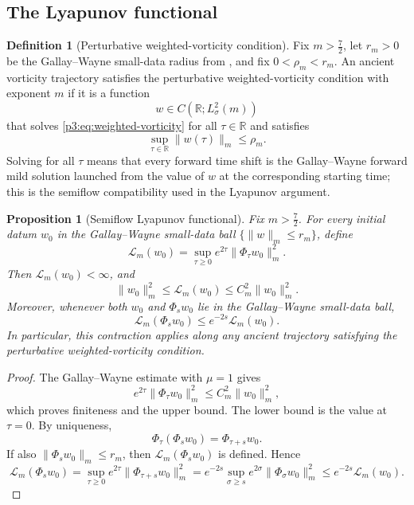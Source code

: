 \documentclass[11pt]{amsart}
\theoremstyle{plain}
\newtheorem{proposition}[proposition]{Proposition}
\theoremstyle{definition}
\newtheorem{definition}[definition]{Definition}
\theoremstyle{remark}
\numberwithin{equation}{section}
\begin{document}
\subsection{The Lyapunov functional}

\begin{definition}[Perturbative weighted-vorticity condition]
\label{p3:def:weighted-vorticity-condition}
Fix \(m>\frac72\), let \(r_m>0\) be the Gallay--Wayne small-data radius from
, and fix \(0<\rho_m<r_m\).
An ancient vorticity trajectory satisfies the perturbative
weighted-vorticity condition with exponent \(m\) if it is a function
\[
   w\in C(\mathbb R;L^2_\sigma(m))
\]
that solves \eqref{p3:eq:weighted-vorticity} for all \(\tau\in\mathbb R\) and
satisfies
\[
   \sup_{\tau\in\mathbb R}\|w(\tau)\|_m\le\rho_m .
\]
Solving for all \(\tau\) means that every forward time shift is the
Gallay--Wayne forward mild solution launched from the value of \(w\) at the
corresponding starting time; this is the semiflow compatibility used in the
Lyapunov argument.
\end{definition}

\begin{proposition}[Semiflow Lyapunov functional]\label{p3:prop:weighted-lyap}
Fix \(m>\frac72\).  For every initial datum \(w_0\) in the Gallay--Wayne
small-data ball \(\{\|w\|_m\le r_m\}\), define
\begin{equation}\label{p3:eq:weighted-lyap}
   \mathcal L_m(w_0)
   =
   \sup_{\tau\ge0}e^{2\tau}\|\Phi_\tau w_0\|_m^2 .
\end{equation}
Then \(\mathcal L_m(w_0)<\infty\), and
\begin{equation}\label{p3:eq:weighted-coercive}
   \|w_0\|_m^2
   \le
   \mathcal L_m(w_0)
   \le
   C_m^2\|w_0\|_m^2 .
\end{equation}
Moreover, whenever both \(w_0\) and \(\Phi_s w_0\) lie in the
Gallay--Wayne small-data ball,
\begin{equation}\label{p3:eq:weighted-contract}
   \mathcal L_m(\Phi_s w_0)
   \le
   e^{-2s}\mathcal L_m(w_0).
\end{equation}
In particular, this contraction applies along any ancient trajectory
satisfying the perturbative weighted-vorticity condition.
\end{proposition}

\begin{proof}
The Gallay--Wayne estimate with \(\mu=1\) gives
\[
   e^{2\tau}\|\Phi_\tau w_0\|_m^2
   \le C_m^2\|w_0\|_m^2,
\]
which proves finiteness and the upper bound.  The lower bound is the value at
\(\tau=0\).  By uniqueness,
\[
   \Phi_\tau(\Phi_s w_0)=\Phi_{\tau+s}w_0 .
\]
If also \(\|\Phi_s w_0\|_m\le r_m\), then \(\mathcal L_m(\Phi_s w_0)\) is
defined.  Hence
\[
   \mathcal L_m(\Phi_s w_0)
   =
   \sup_{\tau\ge0}e^{2\tau}\|\Phi_{\tau+s}w_0\|_m^2
   =
   e^{-2s}\sup_{\sigma\ge s}e^{2\sigma}\|\Phi_\sigma w_0\|_m^2
   \le e^{-2s}\mathcal L_m(w_0).
\]
\end{proof}
\end{document}
